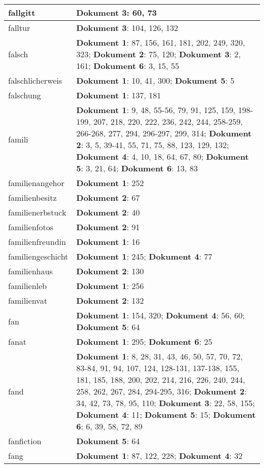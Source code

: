 \documentclass[a5paper]{article}
\begin{document}
\begin{longtable}[l]{|l|p{3in}|}
\hline
fallgitt & \textbf{Dokument 3}: 60, 73 \\
\hline
falltur & \textbf{Dokument 3}: 104, 126, 132 \\
\hline
falsch & \textbf{Dokument 1}: 87, 156, 161, 181, 202, 249, 320, 323; \textbf{Dokument 2}: 75, 120; \textbf{Dokument 3}: 2, 161; \textbf{Dokument 6}: 3, 15, 55 \\
\hline
falschlicherweis & \textbf{Dokument 1}: 10, 41, 300; \textbf{Dokument 5}: 5 \\
\hline
falschung & \textbf{Dokument 1}: 137, 181 \\
\hline
famili & \textbf{Dokument 1}: 9, 48, 55-56, 79, 91, 125, 159, 198-199, 207, 218, 220, 222, 236, 242, 244, 258-259, 266-268, 277, 294, 296-297, 299, 314; \textbf{Dokument 2}: 3, 5, 39-41, 55, 71, 75, 88, 123, 129, 132; \textbf{Dokument 4}: 4, 10, 18, 64, 67, 80; \textbf{Dokument 5}: 3, 21, 64; \textbf{Dokument 6}: 13, 83 \\
\hline
familienangehor & \textbf{Dokument 1}: 252 \\
\hline
familienbesitz & \textbf{Dokument 2}: 67 \\
\hline
familienerbstuck & \textbf{Dokument 2}: 40 \\
\hline
familienfotos & \textbf{Dokument 2}: 91 \\
\hline
familienfreundin & \textbf{Dokument 1}: 16 \\
\hline
familiengeschicht & \textbf{Dokument 1}: 245; \textbf{Dokument 4}: 77 \\
\hline
familienhaus & \textbf{Dokument 2}: 130 \\
\hline
familienleb & \textbf{Dokument 1}: 256 \\
\hline
familienvat & \textbf{Dokument 2}: 132 \\
\hline
fan & \textbf{Dokument 1}: 154, 320; \textbf{Dokument 4}: 56, 60; \textbf{Dokument 5}: 64 \\
\hline
fanat & \textbf{Dokument 1}: 295; \textbf{Dokument 6}: 25 \\
\hline
fand & \textbf{Dokument 1}: 8, 28, 31, 43, 46, 50, 57, 70, 72, 83-84, 91, 94, 107, 124, 128-131, 137-138, 155, 181, 185, 188, 200, 202, 214, 216, 226, 240, 244, 258, 262, 267, 284, 294-295, 316; \textbf{Dokument 2}: 34, 42, 73, 78, 95, 110; \textbf{Dokument 3}: 22, 58, 155; \textbf{Dokument 4}: 11; \textbf{Dokument 5}: 15; \textbf{Dokument 6}: 6, 39, 58, 72, 89 \\
\hline
fanfiction & \textbf{Dokument 5}: 64 \\
\hline
fang & \textbf{Dokument 1}: 87, 122, 228; \textbf{Dokument 4}: 32 \\

\end{longtable}
\end{document}
